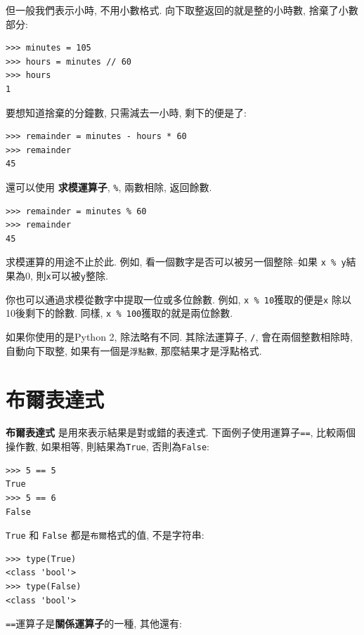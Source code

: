 \documentclass[10pt]{book}
\begin{document}
但一般我們表示小時, 不用小數格式. 
向下取整返回的就是整的小時數, 捨棄了小數部分:

\begin{verbatim}
>>> minutes = 105
>>> hours = minutes // 60
>>> hours
1
\end{verbatim}

要想知道捨棄的分鐘數, 只需減去一小時, 剩下的便是了:

\begin{verbatim}
>>> remainder = minutes - hours * 60
>>> remainder
45
\end{verbatim}


還可以使用 {\bf 求模運算子},  \verb"%",  
兩數相除, 返回餘數. 

\begin{verbatim}
>>> remainder = minutes % 60
>>> remainder
45
\end{verbatim}
%
求模運算的用途不止於此. 例如, 看一個數字是否可以被另一個整除--如果
{\tt x \% y}結果為0, 則{\tt x}可以被{\tt y}整除.

你也可以通過求模從數字中提取一位或多位餘數. 
例如,  {\tt x \% 10}獲取的便是{\tt x} 除以10後剩下的餘數. 
同樣, {\tt x \% 100}獲取的就是兩位餘數. 

如果你使用的是Python 2, 除法略有不同. 
其除法運算子, \verb"/",  會在兩個整數相除時, 自動向下取整, 
如果有一個是{\tt 浮點數}, 那麼結果才是浮點格式. 


\section{布爾表達式}

{\bf 布爾表達式} 是用來表示結果是對或錯的表達式. 
下面例子使用運算子{\tt ==},  比較兩個操作數, 
如果相等, 則結果為{\tt True}, 否則為{\tt False}:

\begin{verbatim}
>>> 5 == 5
True
>>> 5 == 6
False
\end{verbatim}
%
{\tt True} 和 {\tt False} 都是{\tt  布爾}格式的值, 不是字符串:

\begin{verbatim}
>>> type(True)
<class 'bool'>
>>> type(False)
<class 'bool'>
\end{verbatim}
%
 {\tt ==}運算子是{\bf 關係運算子}的一種, 其他還有:
\end{document}
